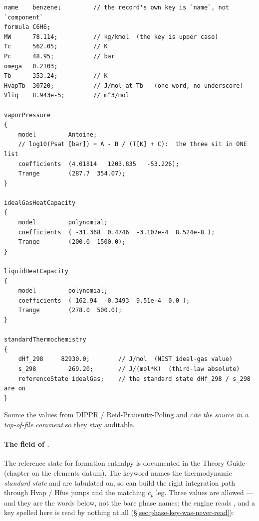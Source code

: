 \documentclass[11pt,a4paper]{article}
\begin{document}
\begin{lstlisting}[language=dict]
name    benzene;         // the record's own key is `name`, not `component`
formula C6H6;
MW      78.114;          // kg/kmol  (the key is upper case)
Tc      562.05;          // K
Pc      48.95;           // bar
omega   0.2103;
Tb      353.24;          // K
HvapTb  30720;           // J/mol at Tb   (one word, no underscore)
Vliq    8.943e-5;        // m^3/mol

vaporPressure
{
    model         Antoine;
    // log10(Psat [bar]) = A - B / (T[K] + C):  the three sit in ONE list
    coefficients  (4.01814   1203.835   -53.226);
    Trange        (287.7  354.07);
}

idealGasHeatCapacity
{
    model         polynomial;
    coefficients  ( -31.368  0.4746  -3.107e-4  8.524e-8 );
    Trange        (200.0  1500.0);
}

liquidHeatCapacity
{
    model         polynomial;
    coefficients  ( 162.94  -0.3493  9.51e-4  0.0 );
    Trange        (278.0  500.0);
}

standardThermochemistry
{
    dHf_298     82930.0;        // J/mol  (NIST ideal-gas value)
    s_298         269.20;       // J/(mol*K)  (third-law absolute)
    referenceState idealGas;    // the standard state dHf_298 / s_298 are on
}
\end{lstlisting}

Source the values from DIPPR / Reid-Prausnitz-Poling and \emph{cite the
source in a top-of-file comment} so they stay auditable.

\paragraph{The  field of .}
The reference state for formation enthalpy is documented in the Theory
Guide (chapter on the elements datum).  The  keyword
names the thermodynamic \emph{standard state}  and
 are tabulated on, so
 can build the right
integration path through Hvap / Hfus jumps and the matching $c_p$ leg.
Three values are allowed --- and they are the words below, not the bare
phase names: the engine reads , and a key spelled
 here is read by nothing at all (\S\ref{sec:phase-key-was-never-read}):
\end{document}
